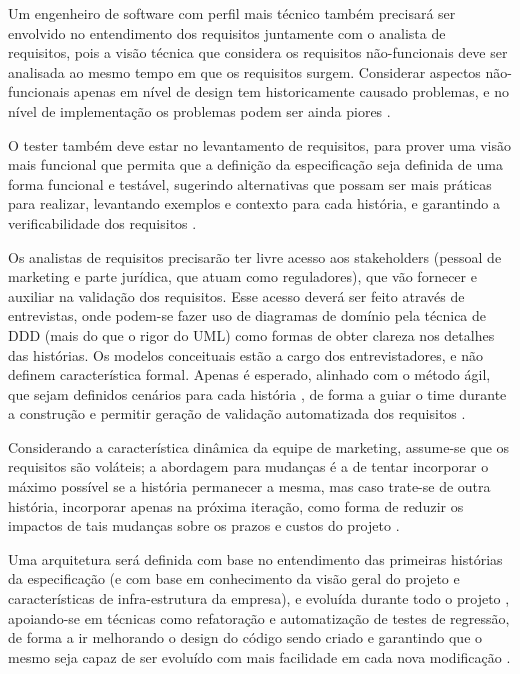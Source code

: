 \documentclass[12pt,journal,compsoc]{IEEEtran}
\begin{document}
Um engenheiro de software com perfil mais técnico também precisará ser envolvido no entendimento dos requisitos juntamente com o analista de requisitos, pois a visão técnica que considera os requisitos não-funcionais deve ser analisada ao mesmo tempo em que os requisitos surgem. Considerar aspectos não-funcionais apenas em nível de design tem historicamente causado problemas, e no nível de implementação os problemas podem ser ainda piores \cite{agile_requirements_definition}.

O tester também deve estar no levantamento de requisitos, para prover uma visão mais funcional que permita que a definição da especificação seja definida de uma forma funcional e testável, sugerindo alternativas que possam ser mais práticas para realizar, levantando exemplos e contexto para cada história, e garantindo a verificabilidade dos requisitos \cite{} \cite{society_software_2004}. %

Os analistas de requisitos precisarão ter livre acesso aos stakeholders (pessoal de marketing e parte jurídica, que atuam como reguladores), que vão fornecer e auxiliar na validação dos requisitos. Esse acesso deverá ser feito através de entrevistas, onde podem-se fazer uso de diagramas de domínio pela técnica de DDD \cite{evans_domain-driven_2004} (mais do que o rigor do UML) como formas de obter clareza nos detalhes das histórias. Os modelos conceituais estão a cargo dos entrevistadores, e não definem característica formal. Apenas é esperado, alinhado com o método ágil, que sejam definidos cenários para cada história \cite{washington2003using}, de forma a guiar o time durante a construção e permitir geração de validação automatizada dos requisitos \cite{melnik_multiple_2007}.

Considerando a característica dinâmica da equipe de marketing, assume-se que os requisitos são voláteis; a abordagem para mudanças é a de tentar incorporar o máximo possível se a história permanecer a mesma, mas caso trate-se de outra história, incorporar apenas na próxima iteração, como forma de reduzir os impactos de tais mudanças sobre os prazos e custos do projeto \cite{zowghi2002study}.

Uma arquitetura será definida com base no entendimento das primeiras histórias da especificação (e com base em conhecimento da visão geral do projeto e características de infra-estrutura da empresa), e evoluída durante todo o projeto \cite{cohn_agile_2009}, apoiando-se em técnicas como refatoração e automatização de testes de regressão, de forma a ir melhorando o design do código sendo criado e garantindo que o mesmo seja capaz de ser evoluído com mais facilidade em cada nova modificação \cite{arora_chauhan_2014}.
\end{document}
